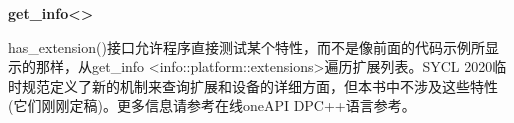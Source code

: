 \hspace*{\fill} \par %
\textbf{get\_info<>}

has\_extension()接口允许程序直接测试某个特性，而不是像前面的代码示例所显示的那样，从get\_info <info::platform::extensions>遍历扩展列表。SYCL 2020临时规范定义了新的机制来查询扩展和设备的详细方面，但本书中不涉及这些特性(它们刚刚定稿)。更多信息请参考在线oneAPI DPC++语言参考。
















